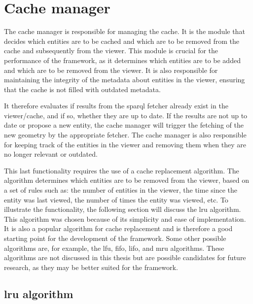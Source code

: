 \section{Cache manager}

The cache manager is responsible for managing the cache. It is the module that decides which entities are to be cached and which are to be removed from the cache and subsequently from the viewer. This module is crucial for the performance of the framework, as it determines which entities are to be added and which are to be removed from the viewer. It is also responsible for maintaining the integrity of the metadata about entities in the viewer, ensuring that the cache is not filled with outdated metadata.

It therefore evaluates if results from the \ac{sparql} fetcher already exist in the viewer/cache, and if so, whether they are up to date. If the results are not up to date or propose a new entity, the cache manager will trigger the fetching of the new geometry by the appropriate fetcher. The cache manager is also responsible for keeping track of the entities in the viewer and removing them when they are no longer relevant or outdated.

This last functionality requires the use of a cache replacement algorithm. The algorithm determines which entities are to be removed from the viewer, based on a set of rules such as: the number of entities in the viewer, the time since the entity was last viewed, the number of times the entity was viewed, etc. To illustrate the functionality, the following section will discuss the \ac{lru} algorithm. This algorithm was chosen because of its simplicity and ease of implementation. It is also a popular algorithm for cache replacement and is therefore a good starting point for the development of the framework. Some other possible algorithms are, for example, the \ac{lfu}, \ac{fifo}, \ac{lifo}, and \ac{mru} algorithms\parencite{cacheAlgorigthms}. These algorithms are not discussed in this thesis but are possible candidates for future research, as they may be better suited for the framework.

\subsection{\acs{lru} algorithm}



